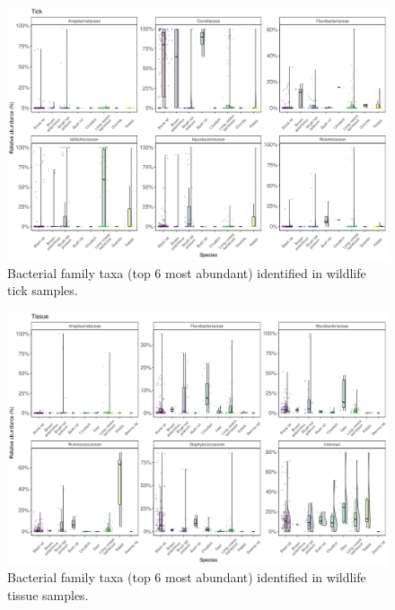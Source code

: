 \documentclass[a4paper, nobind]{templates/ociamthesis}
\begin{document}
\begin{figure}
\includegraphics[width=0.8\linewidth]{figures/ms-figs-appendix/FigA-3.7} \caption[Bacterial family taxa identified in wildlife tick samples]{Bacterial family taxa (top 6 most abundant) identified in wildlife tick samples.}\label{fig:FA37}
\end{figure}

\newpage

\begin{figure}
\includegraphics[width=0.8\linewidth]{figures/ms-figs-appendix/FigA-3.8} \caption[Bacterial family taxa identified in wildlife tissue samples]{Bacterial family taxa (top 6 most abundant) identified in wildlife tissue samples.}\label{fig:FA38}
\end{figure}

\newpage
\end{document}
